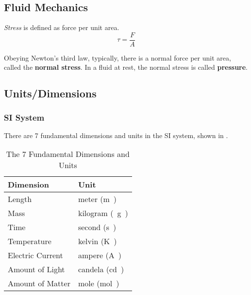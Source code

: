 \subsection{Fluid Mechanics}\label{subsec:Fluid_Mechanics}
\begin{definition}[Stress]\label{def:Stress}
  \emph{Stress} is defined as force per unit area.
  \begin{equation}\label{eq:Stress}
    \tau = \frac{F}{A}
  \end{equation}
\end{definition}

Obeying Newton's third law, typically, there is a normal force per unit area, called the \textbf{normal stress}.
In a fluid at rest, the normal stress is called \textbf{pressure}.

\subsection{Units/Dimensions}\label{subsec:Units_Dimensions}
\subsubsection{SI System}\label{subsubsec:SI_System}
There are 7 fundamental dimensions and units in the SI system, shown in .
\begin{table}[h!tbp]
  \centering
  \begin{tabular}{ll}
    \toprule
    Dimension & Unit \\
    \midrule
    Length & meter (\si{\meter{}}) \\
    Mass & kilogram (\si{\kilo{} \gram{}}) \\
    Time & second (\si{\second{}}) \\
    Temperature & kelvin (\si{\kelvin{}}) \\
    Electric Current & ampere (\si{\ampere{}}) \\
    Amount of Light & candela (\si{\candela{}}) \\
    Amount of Matter & mole (\si{\mole{}}) \\
    \bottomrule
  \end{tabular}
  \caption{The 7 Fundamental Dimensions and Units}
  \label{tab:7_Fundamental_Dimensions}
\end{table}


